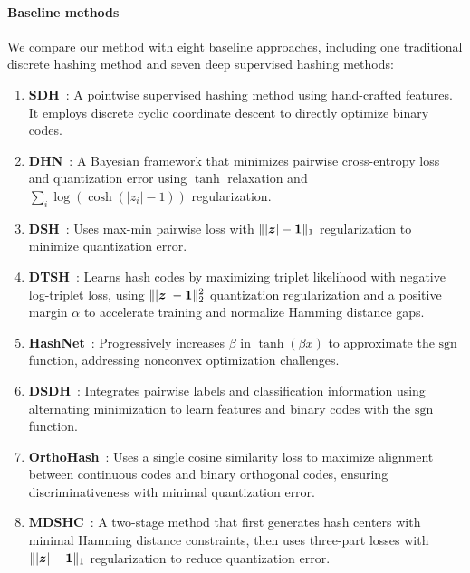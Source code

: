 \paragraph{Baseline methods}
We compare our method with eight baseline approaches, including one traditional discrete hashing method and seven deep supervised hashing methods:
\begin{enumerate}[label=(\roman{*}),leftmargin=2em]
    \item \textbf{SDH}~\cite{shenSupervisedDiscreteHashing2015}: A pointwise supervised hashing method using hand-crafted features. It employs discrete cyclic coordinate descent to directly optimize binary codes.
    
    \item \textbf{DHN}~\cite{zhuDeepHashingNetwork2016}: A Bayesian framework that minimizes pairwise cross-entropy loss and quantization error using $\tanh$ relaxation and $\sum_i\log(\cosh(|z_i|-1))$ regularization.
    
    \item \textbf{DSH}~\cite{liuDeepSupervisedHashing}: Uses max-min pairwise loss with $\||\bm{z}|-\bm{1}\|_1$ regularization to minimize quantization error.
    
    \item \textbf{DTSH}~\cite{wang2016DTSH}: Learns hash codes by maximizing triplet likelihood with negative log-triplet loss, using  $\||\bm{z}|-\bm{1}\|^2_2$  quantization regularization and a positive margin $\alpha$ to accelerate training and normalize Hamming distance gaps.
    
    \item \textbf{HashNet}~\cite{Cao2017HashNetDL}: Progressively increases $\beta$ in $\tanh(\beta x)$ to approximate the $\text{sgn}$ function, addressing nonconvex optimization challenges.
    
    \item \textbf{DSDH}~\cite{li2017deep}: Integrates pairwise labels and classification information using alternating minimization to learn features and binary codes with the $\text{sgn}$ function.
    
    \item \textbf{OrthoHash}~\cite{hoeOneLossAll2021}: Uses a single cosine similarity loss to maximize alignment between continuous codes and binary orthogonal codes, ensuring discriminativeness with minimal quantization error.
    
    \item \textbf{MDSHC}~\cite{wang2023deep}: A two-stage method that first generates hash centers with minimal Hamming distance constraints, then uses three-part losses with $\||\bm{z}|-\bm{1}\|_1$ regularization to reduce quantization error.
\end{enumerate}


